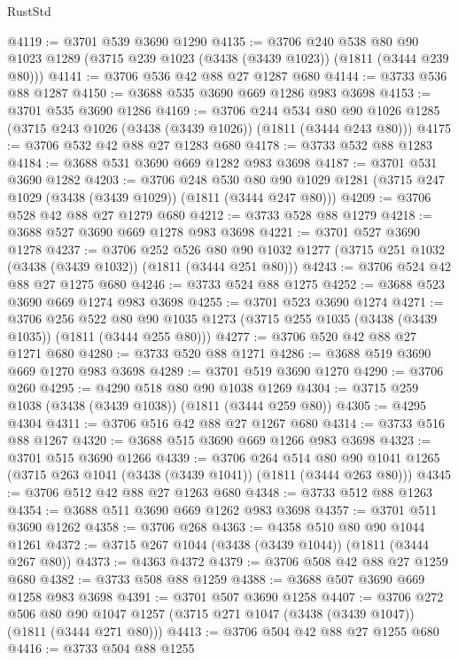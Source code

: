 \begin{lexlean}{RustStd}
\begin{coremodule}
@4119 := @3701 @539 @3690 @1290
@4135 := @3706
    @240
    @538
    @80
    @90
    @1023
    @1289
    (@3715 @239 @1023 (@3438 (@3439 @1023)) (@1811 (@3444 @239 @80)))
@4141 := @3706 @536 @42 @88 @27 @1287 @680
@4144 := @3733 @536 @88 @1287
@4150 := @3688 @535 @3690 @669 @1286 @983 @3698
@4153 := @3701 @535 @3690 @1286
@4169 := @3706
    @244
    @534
    @80
    @90
    @1026
    @1285
    (@3715 @243 @1026 (@3438 (@3439 @1026)) (@1811 (@3444 @243 @80)))
@4175 := @3706 @532 @42 @88 @27 @1283 @680
@4178 := @3733 @532 @88 @1283
@4184 := @3688 @531 @3690 @669 @1282 @983 @3698
@4187 := @3701 @531 @3690 @1282
@4203 := @3706
    @248
    @530
    @80
    @90
    @1029
    @1281
    (@3715 @247 @1029 (@3438 (@3439 @1029)) (@1811 (@3444 @247 @80)))
@4209 := @3706 @528 @42 @88 @27 @1279 @680
@4212 := @3733 @528 @88 @1279
@4218 := @3688 @527 @3690 @669 @1278 @983 @3698
@4221 := @3701 @527 @3690 @1278
@4237 := @3706
    @252
    @526
    @80
    @90
    @1032
    @1277
    (@3715 @251 @1032 (@3438 (@3439 @1032)) (@1811 (@3444 @251 @80)))
@4243 := @3706 @524 @42 @88 @27 @1275 @680
@4246 := @3733 @524 @88 @1275
@4252 := @3688 @523 @3690 @669 @1274 @983 @3698
@4255 := @3701 @523 @3690 @1274
@4271 := @3706
    @256
    @522
    @80
    @90
    @1035
    @1273
    (@3715 @255 @1035 (@3438 (@3439 @1035)) (@1811 (@3444 @255 @80)))
@4277 := @3706 @520 @42 @88 @27 @1271 @680
@4280 := @3733 @520 @88 @1271
@4286 := @3688 @519 @3690 @669 @1270 @983 @3698
@4289 := @3701 @519 @3690 @1270
@4290 := @3706 @260
@4295 := @4290 @518 @80 @90 @1038 @1269
@4304 := @3715 @259 @1038 (@3438 (@3439 @1038)) (@1811 (@3444 @259 @80))
@4305 := @4295 @4304
@4311 := @3706 @516 @42 @88 @27 @1267 @680
@4314 := @3733 @516 @88 @1267
@4320 := @3688 @515 @3690 @669 @1266 @983 @3698
@4323 := @3701 @515 @3690 @1266
@4339 := @3706
    @264
    @514
    @80
    @90
    @1041
    @1265
    (@3715 @263 @1041 (@3438 (@3439 @1041)) (@1811 (@3444 @263 @80)))
@4345 := @3706 @512 @42 @88 @27 @1263 @680
@4348 := @3733 @512 @88 @1263
@4354 := @3688 @511 @3690 @669 @1262 @983 @3698
@4357 := @3701 @511 @3690 @1262
@4358 := @3706 @268
@4363 := @4358 @510 @80 @90 @1044 @1261
@4372 := @3715 @267 @1044 (@3438 (@3439 @1044)) (@1811 (@3444 @267 @80))
@4373 := @4363 @4372
@4379 := @3706 @508 @42 @88 @27 @1259 @680
@4382 := @3733 @508 @88 @1259
@4388 := @3688 @507 @3690 @669 @1258 @983 @3698
@4391 := @3701 @507 @3690 @1258
@4407 := @3706
    @272
    @506
    @80
    @90
    @1047
    @1257
    (@3715 @271 @1047 (@3438 (@3439 @1047)) (@1811 (@3444 @271 @80)))
@4413 := @3706 @504 @42 @88 @27 @1255 @680
@4416 := @3733 @504 @88 @1255

\end{coremodule}
\end{lexlean}
